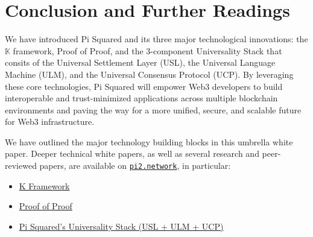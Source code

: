 \documentclass{article}
\newcommand{\K}{\ensuremath{\mathbb{K}}\xspace}
\begin{document}
\section{Conclusion and Further Readings}
\label{sec:further}

We have introduced Pi Squared and its three major technological innovations:
the \K framework, Proof of Proof, and the 3-component Universality Stack 
that consits of
the Universal Settlement Layer (USL),
the Universal Language Machine (ULM),
and the Universal Consensus Protocol (UCP). 
By leveraging these core technologies, Pi Squared will empower Web3 developers to build interoperable and trust-minimized applications across multiple blockchain environments
and paving the way for a more unified, secure, and scalable future for Web3 infrastructure.

We have outlined the major technology building blocks in this umbrella white paper.
Deeper technical white papers, as well as several research and peer-reviewed papers, are available on 
\href{https://pi2.network/papers}{\texttt{pi2.network}}, in particular:
\begin{itemize}
\item \href{https://pi2.network/papers/llvm-k-whitepaper}{K Framework}
\item \href{https://pi2.network/papers/proof-of-proof-whitepaper}{Proof of Proof}
\item \href{https://pi2.network/papers/universality-whitepaper}{Pi Squared's Universality Stack (USL + ULM + UCP)}
\end{itemize}



\end{document}
